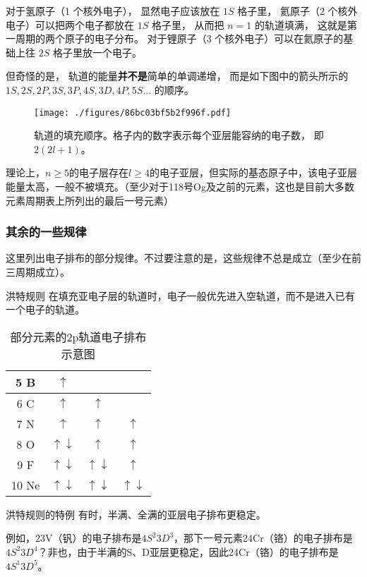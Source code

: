 对于氢原子（1 个核外电子）， 显然电子应该放在 $1S$ 格子里， 氦原子（2 个核外电子）可以把两个电子都放在 $1S$ 格子里， 从而把 $n=1$ 的轨道填满， 这就是第一周期的两个原子的电子分布。 对于锂原子（3 个核外电子）可以在氦原子的基础上往 $2S$ 格子里放一个电子。 

但奇怪的是， 轨道的能量\textbf{并不是}简单的单调递增， 而是如下图中的箭头所示的 $1S, 2S, 2P, 3S, 3P, 4S, 3D, 4P, 5S\dots$ 的顺序。 
\begin{figure}[ht]
\centering
\texttt{[image: ./figures/86bc03bf5b2f996f.pdf]}
\caption{轨道的填充顺序。格子内的数字表示每个亚层能容纳的电子数， 即 $2(2l + 1)$。} \label{fig_Ptable_2}
\end{figure}


理论上，$n\ge5$的电子层存在$l\ge4$的电子亚层，但实际的基态原子中，该电子亚层能量太高，一般不被填充。（至少对于118号Og及之前的元素，这也是目前大多数元素周期表上所列出的最后一号元素）

\subsubsection{其余的一些规律}
这里列出电子排布的部分规律。不过要注意的是，这些规律不总是成立（至少在前三周期成立）。

\begin{theorem}{洪特规则}
在填充亚电子层的轨道时，电子一般优先进入空轨道，而不是进入已有一个电子的轨道。
\end{theorem}

\begin{table}[ht]
\centering
\caption{部分元素的2p轨道电子排布示意图}\label{tab_Ptable_2}
\begin{tabular}{|c|c|c|c|}
\hline
5 B & $\uparrow$ &  & \\
\hline
6 C & $\uparrow$ & $\uparrow$& \\
\hline
7 N & $\uparrow$ & $\uparrow$&$\uparrow$ \\
\hline
8 O & $\uparrow \downarrow$ & $\uparrow$ & $\uparrow$ \\
\hline
9 F & $\uparrow \downarrow$ & $\uparrow \downarrow$ & $\uparrow$ \\
\hline
10 Ne & $\uparrow \downarrow$ & $\uparrow \downarrow$ & $\uparrow \downarrow$ \\
\hline
\end{tabular}
\end{table}

\begin{theorem}{洪特规则的特例}
有时，半满、全满的亚层电子排布更稳定。
\end{theorem}
例如，23V（钒）的电子排布是$4S^2 3D^3$，那下一号元素24Cr（铬）的电子排布是$4S^2 3D^4$？非也，由于半满的S、D亚层更稳定，因此24Cr（铬）的电子排布是$4S^1 3D^5$。

